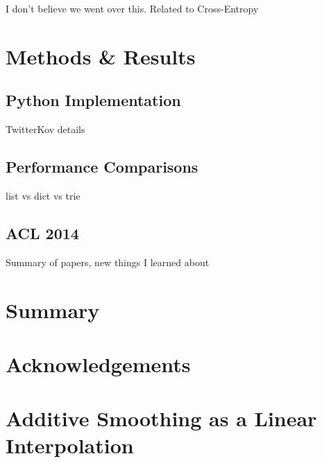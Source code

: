 \documentclass[11pt]{article}
\begin{document}
{\color{red} I don't believe we went over this. Related to Cross-Entropy}

\section{Methods \& Results}

\subsection{Python Implementation}

{\color{red} TwitterKov details}

\subsection{Performance Comparisons}

{\color{red} list vs dict vs trie}

\subsection{ACL 2014}

{\color{red} Summary of papers, new things I learned about}

\section{Summary}

\section{Acknowledgements}




\appendix
\section{Additive Smoothing as a Linear Interpolation}
\end{document}
